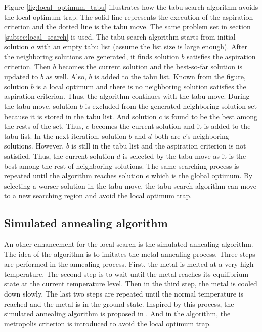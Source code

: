 		
		Figure \ref{fig:local_optimum_tabu} illustrates how the tabu search algorithm avoids the local optimum trap. The solid line represents the execution of the aspiration criterion and the dotted line is the tabu move.
		The same problem set in section \ref{subsec:local_search} is used. The tabu search algorithm starts from initial solution $a$ with an empty tabu list (assume the list size is large enough).
		After the neighboring solutions are generated, it finds solution $b$ satisfies the aspiration criterion. Then $b$ becomes the current
		solution and the best-so-far solution is updated to $b$ as well. Also, $b$ is added to the tabu list. Known from the figure, solution $b$ is
		a local optimum and there is no neighboring solution satisfies the aspiration criterion. Thus, the algorithm continues with the tabu move.
		During the tabu move, solution $b$ is excluded from the generated neighboring solution set because it is stored in the tabu list.
		And solution $c$ is found to be the best among the rests of the set. Thus, $c$ becomes the current solution and it is added to the tabu list.
		In the next iteration, solution $b$ and $d$ both are $c$'s neighboring solutions. However, $b$ is still in the tabu list and the aspiration
		criterion is not satisfied. Thus, the current solution $d$ is selected by the tabu move as it is the best among the rest of neighboring solutions.
		The same searching process is repeated until the algorithm reaches solution $e$ which is the global optimum.
		By selecting a worser solution in the tabu move, the tabu search algorithm can move to a new searching region and avoid the local optimum trap.
	
		\subsection{Simulated annealing algorithm}
		\label{subsec:simulated_annealing}
		An other enhancement for the local search is the simulated annealing algorithm.
		The idea of the algorithm is to imitates the metal annealing process. Three steps
		are performed in the annealing process. First, the metal is melted at a very high
		temperature. The second step is to wait until the metal reaches its equilibrium
		state at the current temperature level. Then in the third step, the metal is
		cooled down slowly. The last two steps are repeated until the normal temperature
		is reached and the metal is in the ground state. Inspired by this process, the
		simulated annealing algorithm is proposed in \cite{10.2307/1690046}. And in the
		algorithm, the metropolis criterion is introduced to avoid the local optimum trap.
		

